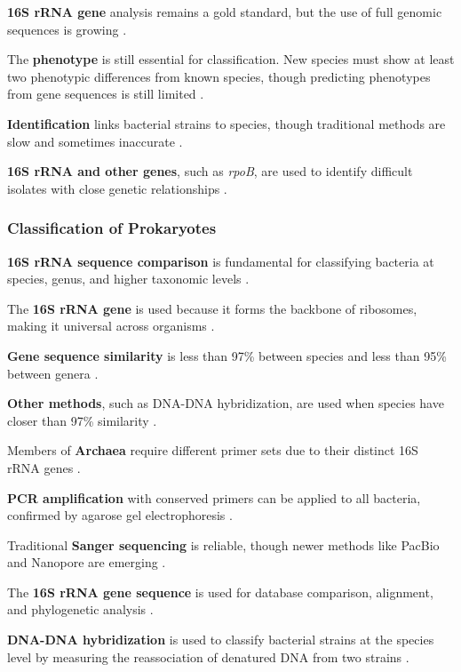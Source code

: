 \textbf{16S rRNA gene} analysis remains a gold standard, but the use of full genomic sequences is growing \cite*{L3-SeqBasedClass}.

The \textbf{phenotype} is still essential for classification. New species must show at least two phenotypic differences from known species, though predicting phenotypes from gene sequences is still limited \cite*{L3-SeqBasedClass}.

\textbf{Identification} links bacterial strains to species, though traditional methods are slow and sometimes inaccurate \cite*{L3-SeqBasedClass}.

\textbf{16S rRNA and other genes}, such as \textit{rpoB}, are used to identify difficult isolates with close genetic relationships \cite*{L3-SeqBasedClass}.
\subsubsection{Classification of Prokaryotes}

\textbf{16S rRNA sequence comparison} is fundamental for classifying bacteria at species, genus, and higher taxonomic levels \cite*{L3-SeqBasedClass}.

The \textbf{16S rRNA gene} is used because it forms the backbone of ribosomes, making it universal across organisms \cite*{L3-SeqBasedClass}.

\textbf{Gene sequence similarity} is less than 97\% between species and less than 95\% between genera \cite*{L3-SeqBasedClass}.

\textbf{Other methods}, such as DNA-DNA hybridization, are used when species have closer than 97\% similarity \cite*{L3-SeqBasedClass}.

Members of \textbf{Archaea} require different primer sets due to their distinct 16S rRNA genes \cite*{L3-SeqBasedClass}.

\textbf{PCR amplification} with conserved primers can be applied to all bacteria, confirmed by agarose gel electrophoresis \cite*{L3-SeqBasedClass}.

Traditional \textbf{Sanger sequencing} is reliable, though newer methods like PacBio and Nanopore are emerging \cite*{L3-SeqBasedClass}.

The \textbf{16S rRNA gene sequence} is used for database comparison, alignment, and phylogenetic analysis \cite*{L3-SeqBasedClass}.


\textbf{DNA-DNA hybridization} is used to classify bacterial strains at the species level by measuring the reassociation of denatured DNA from two strains \cite*{L3-SeqBasedClass}.

